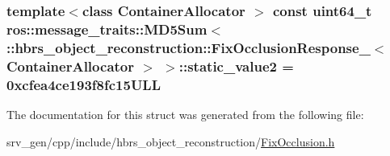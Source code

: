 \hypertarget{structros_1_1message__traits_1_1_m_d5_sum_3_01_1_1hbrs__object__reconstruction_1_1_fix_occlusionf94b88f4ea6b60740cb70fc3946f1a3c_ae289664f41b39b7243899c1cf81e6afb}{
\subsubsection[{static\-\_\-value2}]{\setlength{\rightskip}{0pt plus 5cm}template$<$class Container\-Allocator $>$ const uint64\-\_\-t ros\-::message\-\_\-traits\-::\-M\-D5\-Sum$<$ \-::{\bf hbrs\-\_\-object\-\_\-reconstruction\-::\-Fix\-Occlusion\-Response\-\_\-}$<$ \-Container\-Allocator $>$ $>$\-::{\bf static\-\_\-value2} = 0xcfea4ce193f8fc15\-U\-L\-L}}\label{structros_1_1message__traits_1_1_m_d5_sum_3_01_1_1hbrs__object__reconstruction_1_1_fix_occlusionf94b88f4ea6b60740cb70fc3946f1a3c_ae289664f41b39b7243899c1cf81e6afb}


\-The documentation for this struct was generated from the following file\-:\begin{DoxyCompactItemize}
\item 
srv\-\_\-gen/cpp/include/hbrs\-\_\-object\-\_\-reconstruction/\hyperlink{_fix_occlusion_8h}{\-Fix\-Occlusion.\-h}\end{DoxyCompactItemize}
